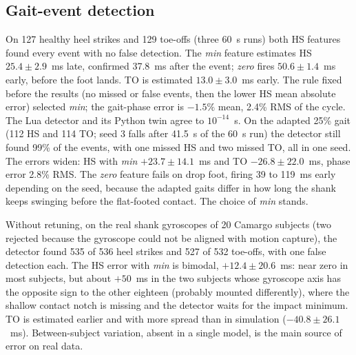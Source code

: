 \subsection{Gait-event detection}
On 127 healthy heel strikes and 129 toe-offs (three 60~s runs) both HS features found every event with no false detection. The \emph{min} feature estimates HS $25.4 \pm 2.9$~ms late, confirmed 37.8~ms after the event; \emph{zero} fires $50.6 \pm 1.4$~ms early, before the foot lands. TO is estimated $13.0 \pm 3.0$~ms early. The rule fixed before the results (no missed or false events, then the lower HS mean absolute error) selected \emph{min}; the gait-phase error is $-1.5\%$ mean, 2.4\% RMS of the cycle. The Lua detector and its Python twin agree to $10^{-14}$~s. On the adapted 25\% gait (112 HS and 114 TO; seed 3 falls after 41.5~s of the 60~s run) the detector still found 99\% of the events, with one missed HS and two missed TO, all in one seed. The errors widen: HS with \emph{min} $+23.7 \pm 14.1$~ms and TO $-26.8 \pm 22.0$~ms, phase error 2.8\% RMS. The \emph{zero} feature fails on drop foot, firing 39 to 119~ms early depending on the seed, because the adapted gaits differ in how long the shank keeps swinging before the flat-footed contact. The choice of \emph{min} stands.

Without retuning, on the real shank gyroscopes of 20 Camargo subjects (two rejected because the gyroscope could not be aligned with motion capture), the detector found 535 of 536 heel strikes and 527 of 532 toe-offs, with one false detection each. The HS error with \emph{min} is bimodal, $+12.4 \pm 20.6$~ms: near zero in most subjects, but about $+50$~ms in the two subjects whose gyroscope axis has the opposite sign to the other eighteen (probably mounted differently), where the shallow contact notch is missing and the detector waits for the impact minimum. TO is estimated earlier and with more spread than in simulation ($-40.8 \pm 26.1$~ms). Between-subject variation, absent in a single model, is the main source of error on real data.


